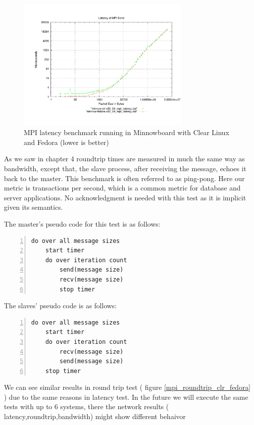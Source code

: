 \begin{figure}[H]
\centering
\includegraphics[width=0.75\textwidth]{images/mpbench_clr_experiments/mpi_latency.pdf}
\caption{MPI latency benchmark running in Minnowboard with Clear Linux and
Fedora (lower is better)}
\label{mpi_latency_clr_fedora}
\end{figure}



As we saw in chapter 4 roundtrip times are measured in much the same way as
bandwidth, except that, the slave process, after receiving the message, echoes
it back to the master.  This benchmark is often referred to as ping-pong. Here
our metric is transactions per second, which is a common metric for database
and server applications. No acknowledgment is needed with this test as it is
implicit given its semantics.

The master's pseudo code for this test is as follows:

\begin{lstlisting}[frame=single,numbers=left]
  do over all message sizes 
    start timer
    do over iteration count
        send(message size)
        recv(message size) 
        stop timer
\end{lstlisting}

The slaves' pseudo code is as follows:

\begin{lstlisting}[frame=single,numbers=left]
do over all message sizes 
    start timer
    do over iteration count
        recv(message size)
        send(message size)
    stop timer
\end{lstlisting}

We can see similar results in round trip test ( figure
\ref{mpi_roundtrip_clr_fedora} ) due to the same reasons in latency test. In
the future we will execute the same tests with up to 6 systems, there the
network results ( latency,roundtrip,bandwidth) might show different behaivor


